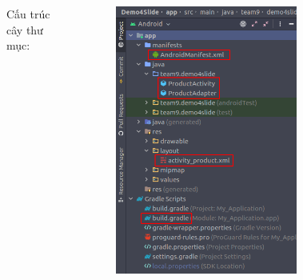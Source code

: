 \documentclass{beamer}
\begin{document}
\begin{frame}
\begin{columns}
\begin{figure}
        \end{figure}
        \indent Cấu trúc cây thư mục:
        \begin{figure}
            \centering
            \includegraphics[height=0.68\textheight]{images/31.png}
        \end{figure}
    \end{columns}
\end{frame}
\end{document}
